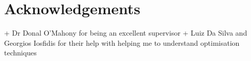 \chapter*{Acknowledgements}

+ Dr Donal O'Mahony for being an excellent supervisor
+ Luiz Da Silva and Georgios Iosfidis for their help with helping me to understand
optimisation techniques